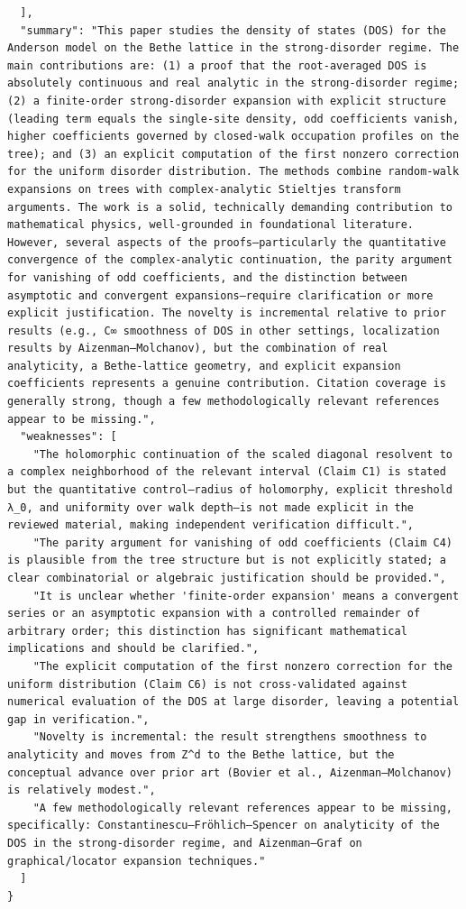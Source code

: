 \documentclass[11pt]{article}
\begin{document}
\begin{verbatim}
  ],
  "summary": "This paper studies the density of states (DOS) for the Anderson model on the Bethe lattice in the strong-disorder regime. The main contributions are: (1) a proof that the root-averaged DOS is absolutely continuous and real analytic in the strong-disorder regime; (2) a finite-order strong-disorder expansion with explicit structure (leading term equals the single-site density, odd coefficients vanish, higher coefficients governed by closed-walk occupation profiles on the tree); and (3) an explicit computation of the first nonzero correction for the uniform disorder distribution. The methods combine random-walk expansions on trees with complex-analytic Stieltjes transform arguments. The work is a solid, technically demanding contribution to mathematical physics, well-grounded in foundational literature. However, several aspects of the proofs—particularly the quantitative convergence of the complex-analytic continuation, the parity argument for vanishing of odd coefficients, and the distinction between asymptotic and convergent expansions—require clarification or more explicit justification. The novelty is incremental relative to prior results (e.g., C∞ smoothness of DOS in other settings, localization results by Aizenman–Molchanov), but the combination of real analyticity, a Bethe-lattice geometry, and explicit expansion coefficients represents a genuine contribution. Citation coverage is generally strong, though a few methodologically relevant references appear to be missing.",
  "weaknesses": [
    "The holomorphic continuation of the scaled diagonal resolvent to a complex neighborhood of the relevant interval (Claim C1) is stated but the quantitative control—radius of holomorphy, explicit threshold λ_0, and uniformity over walk depth—is not made explicit in the reviewed material, making independent verification difficult.",
    "The parity argument for vanishing of odd coefficients (Claim C4) is plausible from the tree structure but is not explicitly stated; a clear combinatorial or algebraic justification should be provided.",
    "It is unclear whether 'finite-order expansion' means a convergent series or an asymptotic expansion with a controlled remainder of arbitrary order; this distinction has significant mathematical implications and should be clarified.",
    "The explicit computation of the first nonzero correction for the uniform distribution (Claim C6) is not cross-validated against numerical evaluation of the DOS at large disorder, leaving a potential gap in verification.",
    "Novelty is incremental: the result strengthens smoothness to analyticity and moves from Z^d to the Bethe lattice, but the conceptual advance over prior art (Bovier et al., Aizenman–Molchanov) is relatively modest.",
    "A few methodologically relevant references appear to be missing, specifically: Constantinescu–Fröhlich–Spencer on analyticity of the DOS in the strong-disorder regime, and Aizenman–Graf on graphical/locator expansion techniques."
  ]
}
\end{verbatim}
\end{document}
